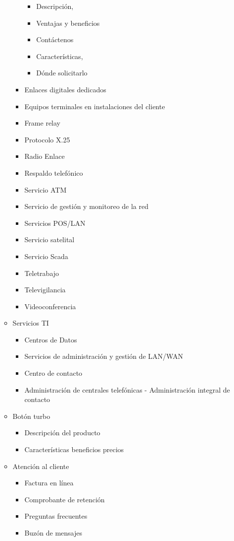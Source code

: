 \documentclass[11pt, letterpaper, oneside, spanish]{scrbook}
\begin{document}
\begin{itemize}
\begin{itemize}
\begin{itemize}
\begin{itemize}
\item Descripción,
\item Ventajas y beneficios
\item Contáctenos
\item Características,
\item Dónde solicitarlo
\end{itemize}
\item Enlaces digitales dedicados
\item Equipos terminales en instalaciones del cliente
\item Frame relay
\item Protocolo X.25
\item Radio Enlace
\item Respaldo telefónico
\item Servicio ATM
\item Servicio de gestión y monitoreo de la red
\item Servicios POS/LAN
\item Servicio satelital
\item Servicio Scada
\item Teletrabajo
\item Televigilancia
\item Videoconferencia
\end{itemize}
\item Servicios TI
\begin{itemize}
\item Centros de Datos
\item Servicios de administración y gestión de LAN/WAN
\item Centro de contacto
\item Administración de centrales telefónicas - Administración integral de
      contacto
\end{itemize}
\item Botón turbo
\begin{itemize}
\item Descripción del producto
\item Características beneficios precios
\end{itemize}
\item Atención al cliente
\begin{itemize}
\item Factura en línea
\item Comprobante de retención
\item Preguntas frecuentes
\item Buzón de mensajes

\end{itemize}
\end{itemize}
\end{itemize}
\end{document}

